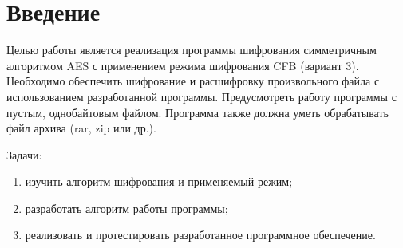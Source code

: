 \section*{Введение}

Целью работы является реализация программы шифрования симметричным алгоритмом
AES с применением режима шифрования CFB (вариант 3). Необходимо обеспечить
шифрование и расшифровку произвольного файла с использованием разработанной
программы. Предусмотреть работу программы с пустым, однобайтовым файлом.
Программа также должна уметь обрабатывать файл архива (rar, zip или др.).

Задачи:
\begin{enumerate}
    \item изучить алгоритм шифрования и применяемый режим;
    \item разработать алгоритм работы программы;
    \item реализовать и протестировать разработанное программное обеспечение.
\end{enumerate}

\pagebreak

